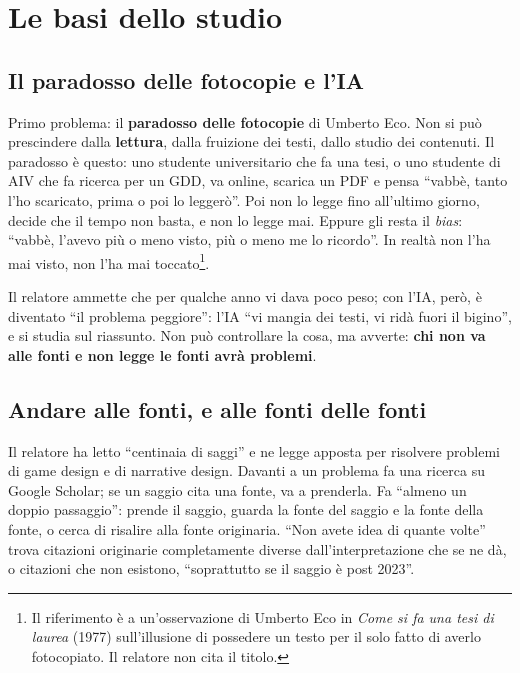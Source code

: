 \section{Le basi dello studio}
\label{p0:sec:basi}

\subsection{Il paradosso delle fotocopie e l'IA}

Primo problema: il \textbf{paradosso delle fotocopie} di Umberto Eco. Non si
può prescindere dalla \textbf{lettura}, dalla fruizione dei testi, dallo
studio dei contenuti. Il paradosso è questo: uno studente universitario che
fa una tesi, o uno studente di AIV che fa ricerca per un GDD, va online,
scarica un PDF e pensa ``vabbè, tanto l'ho scaricato, prima o poi lo
leggerò''. Poi non lo legge fino all'ultimo giorno, decide che il tempo non
basta, e non lo legge mai. Eppure gli resta il \emph{bias}: ``vabbè, l'avevo
più o meno visto, più o meno me lo ricordo''. In realtà non l'ha mai visto,
non l'ha mai toccato\footnote{Il riferimento è a un'osservazione di Umberto
Eco in \emph{Come si fa una tesi di laurea} (1977) sull'illusione di
possedere un testo per il solo fatto di averlo fotocopiato. Il relatore
non cita il titolo.}.

Il relatore ammette che per qualche anno vi dava poco peso; con l'IA, però,
è diventato ``il problema peggiore'': l'IA ``vi mangia dei testi, vi ridà
fuori il bigino'', e si studia sul riassunto. Non può controllare la cosa,
ma avverte: \textbf{chi non va alle fonti e non legge le fonti avrà
problemi}.

\subsection{Andare alle fonti, e alle fonti delle fonti}

Il relatore ha letto ``centinaia di saggi'' e ne legge apposta per risolvere
problemi di game design e di narrative design. Davanti a un problema fa una
ricerca su Google Scholar; se un saggio cita una fonte, va a prenderla.
Fa ``almeno un doppio passaggio'': prende il saggio, guarda la fonte del
saggio e la fonte della fonte, o cerca di risalire alla fonte originaria.
``Non avete idea di quante volte'' trova citazioni originarie completamente
diverse dall'interpretazione che se ne dà, o citazioni che non esistono,
``soprattutto se il saggio è post 2023''.

